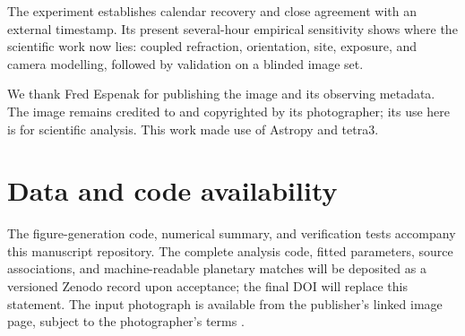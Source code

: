\documentclass{aa}
\begin{document}
The experiment establishes calendar recovery and close agreement with an
external timestamp. Its present several-hour empirical sensitivity shows where
the scientific work now lies: coupled refraction, orientation, site, exposure,
and camera modelling, followed by validation on a blinded image set.

\begin{acknowledgements}
We thank Fred Espenak for publishing the image and its observing metadata. The
image remains credited to and copyrighted by its photographer; its use here is
for scientific analysis. This work made use of Astropy and tetra3.
\end{acknowledgements}

\section*{Data and code availability}
The figure-generation code, numerical summary, and verification tests accompany
this manuscript repository. The complete analysis code, fitted parameters,
source associations, and machine-readable planetary matches will be deposited
as a versioned Zenodo record upon acceptance; the final DOI will replace this
statement. The input photograph is available from the publisher's linked image
page, subject to the photographer's terms \citep{Espenak2018}.




\end{document}
